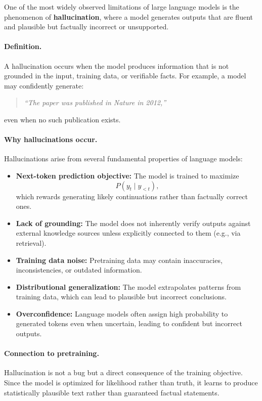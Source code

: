 \documentclass{article}
\begin{document}
One of the most widely observed limitations of large language models is the phenomenon of \textbf{hallucination}, where a model generates outputs that are fluent and plausible but factually incorrect or unsupported.

\paragraph{Definition.}
A hallucination occurs when the model produces information that is not grounded in the input, training data, or verifiable facts. For example, a model may confidently generate:
\begin{quote}
\textit{“The paper was published in Nature in 2012,”}
\end{quote}
even when no such publication exists.

\paragraph{Why hallucinations occur.}
Hallucinations arise from several fundamental properties of language models:

\begin{itemize}
    \item \textbf{Next-token prediction objective:} The model is trained to maximize
    \[
    P(y_t \mid y_{<t}),
    \]
    which rewards generating likely continuations rather than factually correct ones.

    \item \textbf{Lack of grounding:} The model does not inherently verify outputs against external knowledge sources unless explicitly connected to them (e.g., via retrieval).

    \item \textbf{Training data noise:} Pretraining data may contain inaccuracies, inconsistencies, or outdated information.

    \item \textbf{Distributional generalization:} The model extrapolates patterns from training data, which can lead to plausible but incorrect conclusions.

    \item \textbf{Overconfidence:} Language models often assign high probability to generated tokens even when uncertain, leading to confident but incorrect outputs.
\end{itemize}

\paragraph{Connection to pretraining.}
Hallucination is not a bug but a direct consequence of the training objective. Since the model is optimized for likelihood rather than truth, it learns to produce statistically plausible text rather than guaranteed factual statements.
\end{document}
